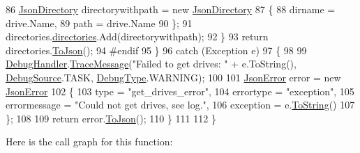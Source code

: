 \begin{DoxyCode}
86                     \mbox{\hyperlink{class_little_weeb_library_1_1_models_1_1_json_directory}{JsonDirectory}} directorywithpath = \textcolor{keyword}{new} 
      \mbox{\hyperlink{class_little_weeb_library_1_1_models_1_1_json_directory}{JsonDirectory}}
87                     \{
88                         dirname = drive.Name,
89                         path = drive.Name
90                     \};
91                     directories.\mbox{\hyperlink{class_little_weeb_library_1_1_models_1_1_json_directories_a370ad019604c1b719b921ea34f8b4f69}{directories}}.Add(directorywithpath);
92                 \}
93                 \textcolor{keywordflow}{return} directories.\mbox{\hyperlink{class_little_weeb_library_1_1_models_1_1_json_directories_a06826e97f8dd170ecad5574cf8ef816a}{ToJson}}();
94 \textcolor{preprocessor}{#endif}
95             \}
96             \textcolor{keywordflow}{catch} (Exception e)
97             \{
98 
99                 \mbox{\hyperlink{class_little_weeb_library_1_1_handlers_1_1_directory_handler_adb882b8ec72046e2b95b6d11228f6927}{DebugHandler}}.\mbox{\hyperlink{interface_little_weeb_library_1_1_handlers_1_1_i_debug_handler_a2e405bc3492e683cd3702fae125221bc}{TraceMessage}}(\textcolor{stringliteral}{"Failed to get drives: "} + e.ToString(), 
      \mbox{\hyperlink{namespace_little_weeb_library_1_1_handlers_a2a6ca0775121c9c503d58aa254d292be}{DebugSource}}.TASK, \mbox{\hyperlink{namespace_little_weeb_library_1_1_handlers_ab66019ed40462876ec4e61bb3ccb0a62}{DebugType}}.WARNING);
100 
101                 \mbox{\hyperlink{class_little_weeb_library_1_1_models_1_1_json_error}{JsonError}} error = \textcolor{keyword}{new} \mbox{\hyperlink{class_little_weeb_library_1_1_models_1_1_json_error}{JsonError}}
102                 \{
103                     type = \textcolor{stringliteral}{"get\_drives\_error"},
104                     errortype = \textcolor{stringliteral}{"exception"},
105                     errormessage = \textcolor{stringliteral}{"Could not get drives, see log."},
106                     exception = e.\mbox{\hyperlink{class_little_weeb_library_1_1_models_1_1_json_error_ad7d5522c90119111d2e929f39e7f6d3c}{ToString}}()
107                 \};
108 
109                 \textcolor{keywordflow}{return} error.\mbox{\hyperlink{class_little_weeb_library_1_1_models_1_1_json_error_a0e3e7dd2e2990404b7f0461742b23440}{ToJson}}();
110             \}
111             
112         \}
\end{DoxyCode}
Here is the call graph for this function\+:\nopagebreak
